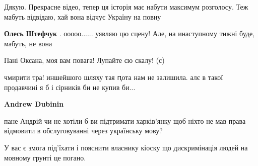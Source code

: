 \begin{itemize}
 
Дякую. Прекрасне відео, тепер ця історія має набути максимум розголосу. Теж
мабуть відвідаю, хай вона відчує Україну на повну

\begin{itemize}
 
\textbf{Олесь Штефчук} . ооооо...... уявляю цю сцену! Але, на инаступному тижні буде, мабуть, не вона
\end{itemize}

 
Пані Оксана, моя вам повага!
Лупайте сю скалу! (с)

 
чмирити тра! иншейшого шляху тая ԥота нам не залишила. алє в такої продавчині я б і сірників би не купив би...

 
\textbf{Andrew Dubinin} 

пане Андрій чи не хотіли б ви підтримати харків'янку щоб ніхто не мав права
відмовити в обслуговуванні через українську мову?

У вас є змога під'їхати і пояснити власнику кіоску що дискримінація людей на
мовному грунті це погано.

\begin{itemize}
 

\end{itemize}
\end{itemize}
